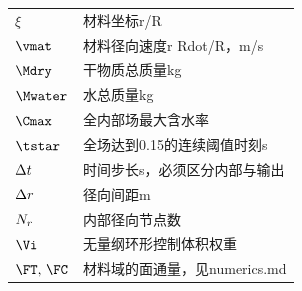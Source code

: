 \begin{longtable}{lp{10cm}}
$\xi$ & 材料坐标r/R \\
$\vmat$ & 材料径向速度r Rdot/R，m/s \\
$\Mdry$ & 干物质总质量kg \\
$\Mwater$ & 水总质量kg \\
$\Cmax$ & 全内部场最大含水率 \\
$\tstar$ & 全场达到0.15的连续阈值时刻s \\
$\Delta t$ & 时间步长s，必须区分内部与输出 \\
$\Delta r$ & 径向间距m \\
$N_r$ & 内部径向节点数 \\
$\Vi$ & 无量纲环形控制体积权重 \\
$\FT,\,\FC$ & 材料域的面通量，见numerics.md \\
\bottomrule\end{longtable}
